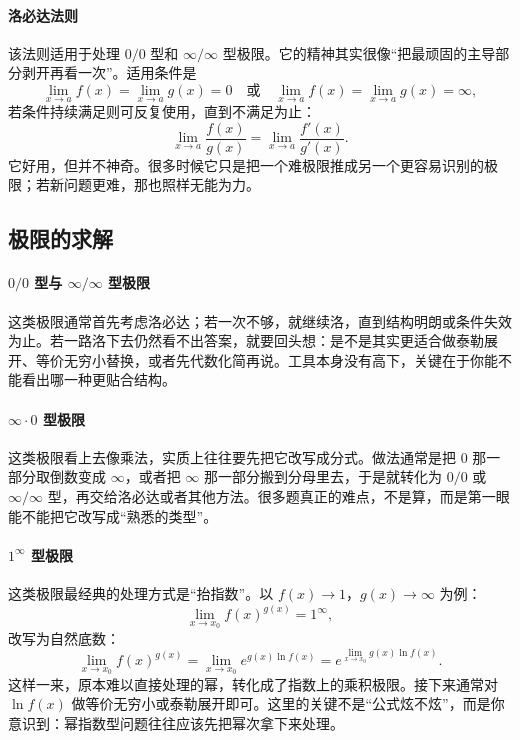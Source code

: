 \documentclass[UTF8]{ctexbook}
\begin{document}
\paragraph{洛必达法则}
该法则适用于处理 $0/0$ 型和 $\infty/\infty$ 型极限。它的精神其实很像“把最顽固的主导部分剥开再看一次”。适用条件是
\[
\lim_{x\to a}f(x)=\lim_{x\to a}g(x)=0
\quad\text{或}\quad
\lim_{x\to a}f(x)=\lim_{x\to a}g(x)=\infty,
\]
若条件持续满足则可反复使用，直到不满足为止：
\[
\lim_{x\to a}\frac{f(x)}{g(x)}=\lim_{x\to a}\frac{f'(x)}{g'(x)}.
\]
它好用，但并不神奇。很多时候它只是把一个难极限推成另一个更容易识别的极限；若新问题更难，那也照样无能为力。

\subsection{极限的求解}
\paragraph{$0/0$ 型与 $\infty/\infty$ 型极限}
这类极限通常首先考虑洛必达；若一次不够，就继续洛，直到结构明朗或条件失效为止。若一路洛下去仍然看不出答案，就要回头想：是不是其实更适合做泰勒展开、等价无穷小替换，或者先代数化简再说。工具本身没有高下，关键在于你能不能看出哪一种更贴合结构。

\paragraph{$\infty\cdot 0$ 型极限}
这类极限看上去像乘法，实质上往往要先把它改写成分式。做法通常是把 $0$ 那一部分取倒数变成 $\infty$，或者把 $\infty$ 那一部分搬到分母里去，于是就转化为 $0/0$ 或 $\infty/\infty$ 型，再交给洛必达或者其他方法。很多题真正的难点，不是算，而是第一眼能不能把它改写成“熟悉的类型”。

\paragraph{$1^\infty$ 型极限}
这类极限最经典的处理方式是“抬指数”。以 $f(x)\to 1$，$g(x)\to\infty$ 为例：
\[
\lim_{x\to x_0} f(x)^{g(x)}=1^\infty,
\]
改写为自然底数：
\[
\lim_{x\to x_0} f(x)^{g(x)}
=\lim_{x\to x_0} e^{g(x)\ln f(x)}
=e^{\lim_{x\to x_0} g(x)\ln f(x)}.
\]
这样一来，原本难以直接处理的幂，转化成了指数上的乘积极限。接下来通常对 $\ln f(x)$ 做等价无穷小或泰勒展开即可。这里的关键不是“公式炫不炫”，而是你意识到：幂指数型问题往往应该先把幂次拿下来处理。



\newpage
\end{document}
